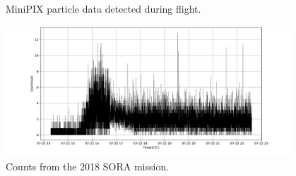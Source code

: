 \begin{figure}[h!]
\hfill
{}
\hfill
{}
\hfill
\caption{MiniPIX particle data detected during flight.}
\label{fig:fitpix-data}
\end{figure}

\begin{figure}[h!]
	\begin{center}
	\includegraphics[width=0.95\textwidth]{figures/counts_per_second_2018.pdf}
	\caption{Counts from the 2018 SORA mission.}
	\label{fig:2018-minipix-data}
	\end{center}
\end{figure}

